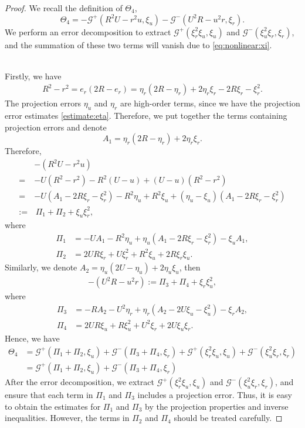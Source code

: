 \documentclass[11pt]{article}
\newcommand{\Gcal} {\mathcal{G}}
\numberwithin{equation}{section}
\begin{document}
\begin{proof}
We recall the definition of $\Theta_4$,
$$\Theta_4=-\Gcal^+(R^2U-r^2u, \xi_u)-\Gcal^-(U^2R-u^2r, \xi_r).$$
We perform an error decomposition to extract  $\Gcal^+(\xi_r^2\xi_u, \xi_u)$ and $\Gcal^-(\xi_u^2\xi_r, \xi_r)$, and the summation of these two terms will vanish due to \eqref{eq:nonlinear:xi}.

\\
Firstly, we have
\begin{align*}
R^2-r^2=e_r(2R-e_r)=\eta_r(2R-\eta_r)+2\eta_r\xi_r-2R\xi_r-\xi_r^2.
\end{align*}
The projection errors $\eta_u$ and $\eta_r$ are high-order terms, since we have the projection error estimates \eqref{estimate:eta}.
Therefore, we put together the terms containing projection errors and denote $$A_1=\eta_r(2R-\eta_r)+2\eta_r\xi_r.$$
Therefore,
\begin{align*}
&-(R^2U-r^2u)\\
=&-U(R^2-r^2)-R^2(U-u)+(U-u)(R^2-r^2)\\
=&-U(A_1-2R\xi_r-\xi_r^2)-R^2\eta_u+R^2\xi_u+(\eta_u-\xi_u)(A_1-2R\xi_r-\xi_r^2)\\
:=&\,\Pi_1+\Pi_2+\xi_u\xi_r^2,
\end{align*}
where
\begin{align*}
\Pi_1&=-UA_1-R^2\eta_u+\eta_u(A_1-2R\xi_r-\xi_r^2)-\xi_uA_1,\\
\Pi_2&=2UR\xi_r+U\xi_r^2+R^2\xi_u+2R\xi_r\xi_u.
\end{align*}
Similarly, we denote $A_2=\eta_u(2U-\eta_u)+2\eta_u\xi_u$, then
\begin{align*}
-(U^2R-u^2r):=\Pi_3+\Pi_4+\xi_r\xi_u^2,
\end{align*}
where
\begin{align*}
\Pi_3&=-RA_2-U^2\eta_r+\eta_r(A_2-2U\xi_u-\xi_u^2)-\xi_rA_2,\\
\Pi_4&=2UR\xi_u+R\xi_u^2+U^2\xi_r+2U\xi_u\xi_r.
\end{align*}
Hence, we have
\begin{align*}
\Theta_4&=\Gcal^+(\Pi_1+\Pi_2, \xi_u)+\Gcal^-(\Pi_3+\Pi_4, \xi_r)+\Gcal^+(\xi_r^2\xi_u, \xi_u)+\Gcal^-(\xi_u^2\xi_r, \xi_r)\\
&=\Gcal^+(\Pi_1+\Pi_2, \xi_u)+\Gcal^-(\Pi_3+\Pi_4, \xi_r)
\end{align*}
After the error decomposition, we extract $\Gcal^+(\xi_r^2\xi_u, \xi_u)$ and $\Gcal^-(\xi_u^2\xi_r, \xi_r)$, and ensure that each term in $\Pi_1$ and $\Pi_3$ includes a projection error. Thus, it is easy to obtain the estimates for $\Pi_1$ and $\Pi_3$ by the projection properties and inverse inequalities.  However, the terms in  $\Pi_2$ and $\Pi_4$ should be treated carefully.


\end{proof}
\end{document}
